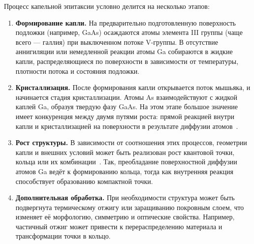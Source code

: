 \documentclass[14pt,oneside]{extarticle}
\begin{document}
Процесс капельной эпитаксии условно делится на несколько этапов:

\begin{enumerate}
    \item \textbf{Формирование капли.} На предварительно подготовленную поверхность подложки (например, GaAs) осаждаются атомы элемента III группы (чаще всего — галлия) при выключенном потоке V-группы. В отсутствие аннигиляции или немедленной реакции атомы Ga собираются в жидкие капли, распределяющиеся по поверхности в зависимости от температуры, плотности потока и состояния подложки.
    
    \item \textbf{Кристаллизация.} После формирования капли открывается поток мышьяка, и начинается стадия кристаллизации. Атомы As взаимодействуют с жидкой каплей Ga, образуя твердую фазу GaAs. На этом этапе большое значение имеет конкуренция между двумя путями роста: прямой реакцией внутри капли и кристаллизацией на поверхности в результате диффузии атомов~\cite{Yamagiwa2020}.
    
    \item \textbf{Рост структуры.} В зависимости от соотношения этих процессов, геометрии капли и внешних условий может быть реализован рост квантовой точки, кольца или их комбинации~\cite{Reyes2013}. Так, преобладание поверхностной диффузии атомов Ga ведёт к формированию кольца, тогда как внутренняя реакция способствует образованию компактной точки.
    
    \item \textbf{Дополнительная обработка.} При необходимости структура может быть подвергнута термическому отжигу или заращиванию покровным слоем, что изменяет её морфологию, симметрию и оптические свойства. Например, частичный отжиг может привести к перераспределению материала и трансформации точки в кольцо.
\end{enumerate}
\end{document}

